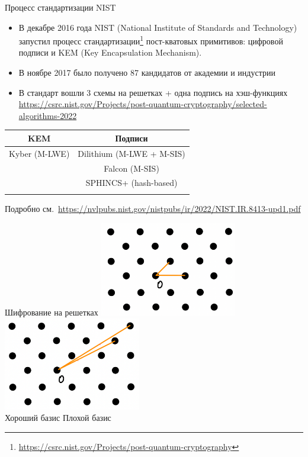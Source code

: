 \documentclass[usenames,dvipsnames, 9pt]{beamer}
\begin{document}
\begin{frame}{Процесс стандартизации NIST}
	
	\large
	\begin{itemize}
		\setlength\itemsep{5pt}
		\item В декабре 2016 года NIST (National Institute of Standards and Technology) запустил процесс стандартизации\footnote{\url{https://csrc.nist.gov/Projects/post-quantum-cryptography}} пост-кватовых примитивов: цифровой подписи и KEM (Key Encapsulation Mechanism).
		
		\item В ноябре 2017 было получено 87 кандидатов от академии и индустрии
		
		\item В стандарт вошли 3 схемы на решетках + одна подпись на хэш-функциях \url{https://csrc.nist.gov/Projects/post-quantum-cryptography/selected-algorithms-2022}
	\end{itemize}
	\centering
	\tabcolsep 10pt
	\renewcommand{\arraystretch}{1.2}
	\begin{tabular}{c|c}
		KEM & Подписи \\ \hline
		Kyber (M-LWE) & Dilithium (M-LWE + M-SIS) \\
		 & Falcon (M-SIS) \\
		& SPHINCS+  (hash-based) \\
			& \\
	\end{tabular}

	Подробно см.~\url{https://nvlpubs.nist.gov/nistpubs/ir/2022/NIST.IR.8413-upd1.pdf}
\end{frame}

{
	\begin{frame}{Шифрование на решетках}
		\includegraphics[width=0.45\textwidth]{goodbasis1}%
		\hspace{20pt}
		\includegraphics[width=0.45\textwidth]{badbasis1} \\[10pt]
		\Large
		\centering
		Хороший базис \hspace{60pt} Плохой базис

	\end{frame}
}
\end{document}
